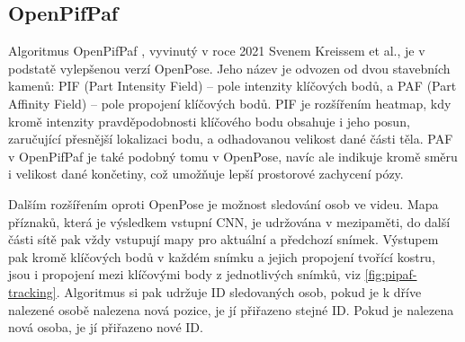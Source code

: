 \subsection{OpenPifPaf}

Algoritmus OpenPifPaf \cite{openpifpaf}, vyvinutý v roce 2021 Svenem Kreissem
et al., je v podstatě vylepšenou verzí OpenPose. Jeho název je odvozen od dvou
stavebních kamenů: PIF (Part Intensity Field) – pole intenzity klíčových bodů,
a PAF (Part Affinity Field) – pole propojení klíčových bodů. PIF je rozšířením
heatmap, kdy kromě intenzity pravděpodobnosti klíčového bodu obsahuje i jeho
posun, zaručující přesnější lokalizaci bodu, a odhadovanou velikost dané části
těla. PAF v OpenPifPaf je také podobný tomu v OpenPose, navíc ale indikuje
kromě směru i velikost dané končetiny, což umožňuje lepší prostorové zachycení
pózy.

Dalším rozšířením oproti OpenPose je možnost sledování osob ve videu. Mapa
příznaků, která je výsledkem vstupní CNN, je udržována v mezipaměti, do další
části sítě pak vždy vstupují mapy pro aktuální a předchozí snímek. Výstupem pak
kromě klíčových bodů v každém snímku a jejich propojení tvořící kostru, jsou i
propojení mezi klíčovými body z jednotlivých snímků, viz
\ref{fig:pipaf-tracking}. Algoritmus si pak udržuje ID sledovaných osob, pokud
je k dříve nalezené osobě nalezena nová pozice, je jí přiřazeno stejné ID.
Pokud je nalezena nová osoba, je jí přiřazeno nové ID.

